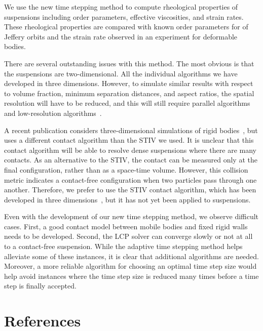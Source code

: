 \documentclass[preprint, 10pt]{elsarticle}
\begin{document}
We use the new time stepping method to compute rheological properties of
suspensions including order parameters, effective viscosities, and
strain rates.  These rheological properties are compared with known
order parameters for of Jeffery orbits and the strain rate observed in
an experiment for deformable bodies.

There are several outstanding issues with this method. The most obvious
is that the suspensions are two-dimensional.  All the individual
algorithms we have developed in three dimensions.  However, to simulate
similar results with respect to volume fraction, minimum separation
distances, and aspect ratios, the spatial resolution will have to be
reduced, and this will still require parallel algorithms and
low-resolution algorithms~\cite{Kabacogulu2017}.  

A recent publication considers three-dimensional simulations of rigid
bodies~\cite{cor-gre-rac-vee2017}, but uses a different contact
algorithm than the STIV we used.  It is unclear that this contact
algorithm will be able to resolve dense suspensions where there are many
contacts.  As an alternative to the STIV, the contact can be measured
only at the final configuration, rather than as a space-time volume.
However, this collision metric indicates a contact-free configuration
when two particles pass through one another.  Therefore, we prefer to
use the STIV contact algorithm, which has been developed in three
dimensions~\cite{Harmon2011}, but it has not yet been applied to
suspensions.

Even with the development of our new time stepping method, we observe
difficult cases.  First, a good contact model between mobile bodies and
fixed rigid walls needs to be developed.  Second, the LCP solver can
converge slowly or not at all to a contact-free suspension.  While the
adaptive time stepping method helps alleviate some of these instances,
it is clear that additional algorithms are needed. Moreover, a more
reliable algorithm for choosing an optimal time step size would help
avoid instances where the time step size is reduced many times before a
time step is finally accepted.


\section*{References}

 

\end{document}
